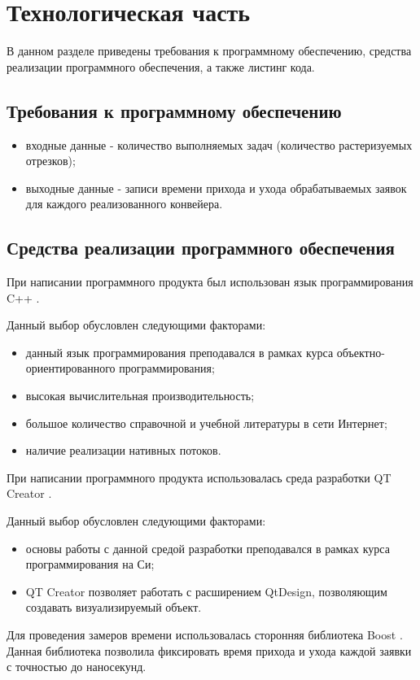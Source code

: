 \documentclass[12pt]{report}
\begin{document}
\chapter{Технологическая часть}
В данном разделе приведены требования к программному обеспечению, средства реализации программного обеспечения, а также листинг кода.

\section{Требования к программному обеспечению}
\begin{itemize}
\item входные данные - количество выполняемых задач (количество растеризуемых отрезков);
\item выходные данные - записи времени прихода и ухода обрабатываемых заявок для каждого реализованного конвейера.
\end{itemize}

\section{Средства реализации программного обеспечения}
При написании программного продукта был использован язык программирования C++ \cite{Cpp}.

Данный выбор обусловлен следующими факторами:
\begin{itemize}
\item данный язык программирования преподавался в рамках курса объектно-ориентированного программирования;
\item высокая вычислительная производительность;
\item большое количество справочной и учебной литературы в сети Интернет;
\item наличие реализации нативных потоков.
\end{itemize}

При написании программного продукта использовалась среда разработки QT Creator \cite{QT}.

Данный выбор обусловлен следующими факторами:
\begin{itemize}
\item основы работы с данной средой разработки преподавался в рамках курса программирования на Си;
\item QT Creator позволяет работать с расширением QtDesign, позволяющим создавать визуализируемый объект.
\end{itemize}

Для проведения замеров времени использовалась сторонняя библиотека Boost \cite{Boost}. Данная библиотека позволила фиксировать время прихода и ухода каждой заявки с точностью до наносекунд.
\end{document}
